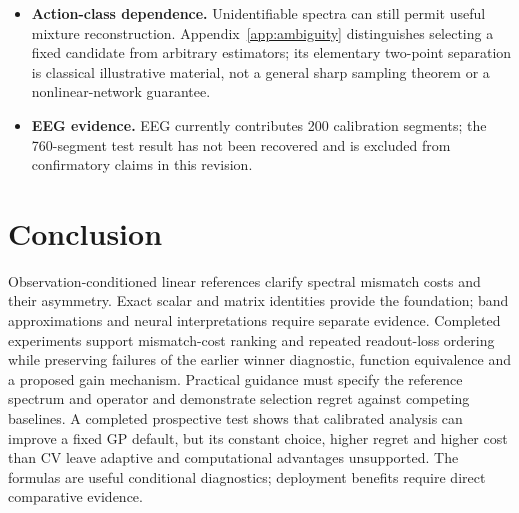 \begin{itemize}
noise settings with fixed draws, one operator and one 32-image calibration.
Zero observed severe degradations does not certify a population rate below
5\%. Analysis chooses the same prior in all cases, so its improvement
over the default does not establish target-specific adaptation. It trails
CV in accuracy and cost. Four-probe variability, calibration mismatch and
unobserved spectral components remain limitations; no INR architecture
selection is established. Oracle candidates were not all saved as pixels.
\item \textbf{Action-class dependence.} Unidentifiable spectra can still
permit useful mixture reconstruction. Appendix~\ref{app:ambiguity}
distinguishes selecting a fixed candidate from arbitrary estimators;
its elementary two-point separation is classical illustrative material,
not a general sharp sampling theorem or a nonlinear-network guarantee.
\item \textbf{EEG evidence.} EEG currently contributes 200 calibration segments;
the 760-segment test result has not been recovered and is excluded from
confirmatory claims in this revision.
\end{itemize}

\section{Conclusion}
Observation-conditioned linear references clarify spectral mismatch costs
and their asymmetry. Exact scalar and matrix identities provide the
foundation; band approximations and neural interpretations require
separate evidence. Completed experiments support mismatch-cost ranking
and repeated readout-loss ordering while preserving failures of the earlier
winner diagnostic, function equivalence and a proposed gain mechanism. Practical
guidance must specify the reference spectrum and operator and demonstrate
selection regret against competing baselines. A completed prospective test
shows that calibrated analysis can improve a fixed GP default, but its
constant choice, higher regret and higher cost than CV leave adaptive and
computational advantages unsupported. The formulas are useful conditional
diagnostics; deployment benefits require direct comparative evidence.

